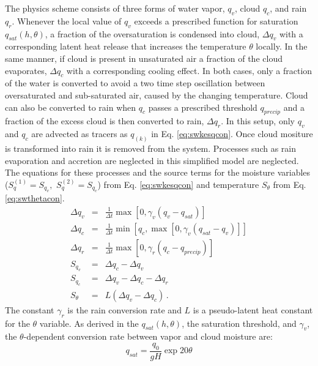    The \cite{zerroukat2015moist} physics scheme consists of three forms of water vapor, 
$q_v$, cloud $q_c$, and rain $q_r$.  Whenever the local value of $q_v$ exceeds a 
prescribed function for saturation $q_{sat}(h, \theta)$, a fraction of the 
oversaturation is condensed into cloud, $\Delta q_v$ with a corresponding latent 
heat release that increases the temperature $\theta$ locally. In the same manner, 
if cloud is present in unsaturated air a fraction of the cloud evaporates, $\Delta q_c$ 
with a corresponding cooling effect. In both cases, only a fraction of the water is 
converted to avoid a two time step oscillation between oversaturated and sub-saturated 
air, caused by the changing temperature. Cloud can also be converted to rain when $q_c$ 
passes a prescribed threshold $q_{precip}$ and a fraction of the excess cloud is then 
converted to rain, $\Delta q_r$. In this setup, only $q_v$ and $q_c$ are advected as 
tracers as $q_{(k)}$ in Eq. \ref{eq:swkesqcon}. Once cloud mositure is transformed 
into rain it is removed from the system. Processes such as rain evaporation and 
accretion are neglected in this simplified model are neglected. The equations for 
these processes and the source terms for the moisture variables 
($S_q^{(1)}=S_{q_v}, \,\, S_q^{(2)}=S_{q_c}$) from Eq. \ref{eq:swkesqcon} 
and temperature $S_\theta$ from Eq. \ref{eq:swthetacon}.
   \begin{eqnarray}
     \Delta q_v & = & \frac{1}{\Delta t}\max \left[ 0, \gamma_v\left(q_v - q_{sat}\right)\right]\\
     \Delta q_c & = & \frac{1}{\Delta t}\min\left[ q_c, \max \left[0, \gamma_v\left(q_{sat} - q_v \right)\right]\right] \\
     \Delta q_r & = & \frac{1}{\Delta t}\max \left[ 0, \gamma_r\left(q_c - q_{precip}\right)\right]\\
     S_{q_v} & = & \Delta q_c - \Delta q_v \\
     S_{q_c} & = & \Delta q_v - \Delta q_c - \Delta q_r \\
     S_{\theta} & = & L\left(\Delta q_v - \Delta q_c\right)\,.
   \end{eqnarray}
The constant $\gamma_r$ is the rain conversion rate and $L$ is a pseudo-latent heat 
constant for the $\theta$ variable. As derived in \cite{zerroukat2015moist} the 
$q_{sat}(h, \theta)$, the saturation threshold, and $\gamma_v$, the $\theta$-dependent 
conversion rate between vapor and cloud moisture are:
   \begin{equation}
     \label{eq:qsat} q_{sat} = \frac{q_0}{gH}\exp{20\theta}
   \end{equation}
